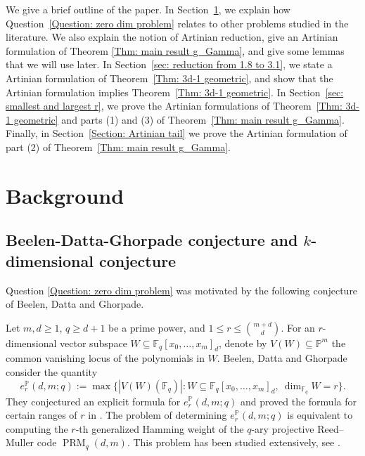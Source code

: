 \documentclass[11pt]{amsart}
\theoremstyle{definition}
\begin{document}
We give a brief outline of the paper.
In Section~\ref{Section: Background}, we explain how Question~\ref{Question: zero dim problem} relates to other problems studied in the literature. We also explain the notion of Artinian reduction, give an Artinian formulation of Theorem \ref{Thm: main result g_Gamma}, and give some lemmas that we will use later.
In Section~\ref{sec: reduction from 1.8 to 3.1}, we state a Artinian formulation of Theorem~\ref{Thm: 3d-1 geometric}, and show that the Artinian formulation implies Theorem~\ref{Thm: 3d-1 geometric}.
In Section~\ref{sec: smallest and largest r}, we prove the Artinian formulations of Theorem~\ref{Thm: 3d-1 geometric} and parts (1) and (3) of Theorem~\ref{Thm: main result g_Gamma}. Finally, in Section~\ref{Section: Artinian tail} we prove the Artinian formulation of part (2) of Theorem~\ref{Thm: main result g_Gamma}.



\section{Background}\label{Section: Background}

\subsection{Beelen-Datta-Ghorpade conjecture and $k$-dimensional conjecture}


Question \ref{Question: zero dim problem} was motivated by the following conjecture of Beelen, Datta and Ghorpade. 

Let $m,d\ge1$, $q\ge d+1$ be a prime power, and $1\le r\le\binom{m+d}{d}$. For an \(r\)-dimensional vector subspace \(W\subseteq\mathbb F_q[x_0,\ldots,x_m]_d\), denote by \(V(W)\subseteq\mathbb P^m\) the common vanishing locus of the polynomials in \(W\). Beelen, Datta and Ghorpade consider the quantity
\[
e_r^{\mathbb P}(d,m;q)
:=
\max\bigl\{|V(W)(\mathbb F_q)|:
W\subseteq\mathbb F_q[x_0,\ldots,x_m]_d,\ 
\dim_{\mathbb F_q}W=r\bigr\}.
\]
They conjectured an explicit formula for \(e_r^{\mathbb P}(d,m;q)\) and proved the formula for certain ranges of $r$ in \cite{beelen2018maximum, beelen2022combinatorial}. The problem of determining $e_r^{\mathbb P}(d,m;q)$ is equivalent to computing the $r$-th generalized Hamming weight of the $q$-ary projective Reed–Muller code $\operatorname{PRM}_q(d,m)$.
This problem has been studied extensively, see
\cite{beelen2019vanishing,boguslavsky1997number,
datta2015conjecture,datta2017number,datta2017remarks,
san2024recursive,serre1991lettre,
singhal2025conjecturebeelendattaghorpade,
sorensen1991projective,zanella1998linear}.
\end{document}
